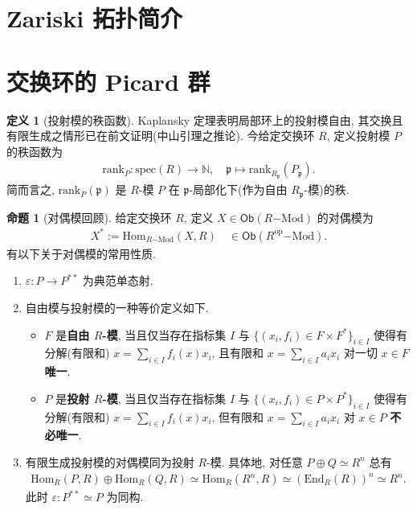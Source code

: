 \documentclass{MainStyle}
\theoremstyle{definition}
\theoremstyle{definition}
\theoremstyle{definition}
\newtheorem{definition}{定义}
\theoremstyle{definition}
\newtheorem{proposition}{命题}
\theoremstyle{definition}
\theoremstyle{definition}
\theoremstyle{definition}
\theoremstyle{remark}
\theoremstyle{remark}
\begin{document}
\maketitle

\section{Zariski 拓扑简介}

\section{交换环的 Picard 群}

\begin{definition}[投射模的秩函数]
    Kaplansky 定理表明局部环上的投射模自由, 其交换且有限生成之情形已在前文证明(中山引理之推论). 今给定交换环 $R$, 定义投射模 $P$ 的秩函数为
    \begin{align*}
        \mathrm{rank}_P:\mathrm{spec}(R)\to \mathbb N,\quad \mathfrak p\mapsto \mathrm{rank}_{R_{\mathfrak p}}(P_{\mathfrak p}).
    \end{align*}
    简而言之, $\mathrm{rank}_P(\mathfrak p)$ 是 $R$-模 $P$ 在 $\mathfrak p$-局部化下(作为自由 $R_{\mathfrak p}$-模)的秩.
\end{definition}

\begin{proposition}[对偶模回顾]
    给定交换环 $R$, 定义 $X\in \mathsf{Ob}(R\mathrm{-Mod})$ 的对偶模为
    \begin{align*}
        X^\ast:=\mathrm{Hom}_{R\mathrm{-Mod}}(X,R)\quad \in \mathsf{Ob}(R^{\mathrm{op}}\mathrm{-Mod}).
    \end{align*}
    有以下关于对偶模的常用性质.
    \begin{enumerate}
        \item $\varepsilon: P\to P^{\ast\ast}$ 为典范单态射.
        \item 自由模与投射模的一种等价定义如下.
              \begin{itemize}
                  \item $F$ 是\textbf{自由 $R$-模}, 当且仅当存在指标集 $I$ 与 $\{(x_i,f_i)\in F\times F^\ast\}_{i\in I}$ 使得有分解(有限和) $\displaystyle x=\sum _{i\in I}f_i(x)x_i$, 且有限和 $\displaystyle x=\sum _{i\in I}a_i x_i$ 对一切 $x\in F$ \textbf{唯一}.
                  \item $P$ 是\textbf{投射 $R$-模}, 当且仅当存在指标集 $I$ 与 $\{(x_i,f_i)\in P\times P^\ast\}_{i\in I}$ 使得有分解(有限和) $\displaystyle x=\sum _{i\in I}f_i(x)x_i$, 但有限和 $\displaystyle x=\sum _{i\in I}a_i x_i$ 对 $x\in P$ \textbf{不必唯一}.
              \end{itemize}
        \item 有限生成投射模的对偶模同为投射 $R$-模. 具体地, 对任意 $P\oplus Q\simeq R^n$ 总有
              \begin{align*}
                  \mathrm{Hom}_R(P,R)\oplus \mathrm{Hom}_R(Q,R)\simeq \mathrm{Hom}_R(R^n,R)\simeq (\mathrm{End}_R(R))^n\simeq R^n.
              \end{align*}
              此时 $\varepsilon: P^{\ast\ast}\simeq P$ 为同构.
    \end{enumerate}
\end{proposition}
\end{document}
